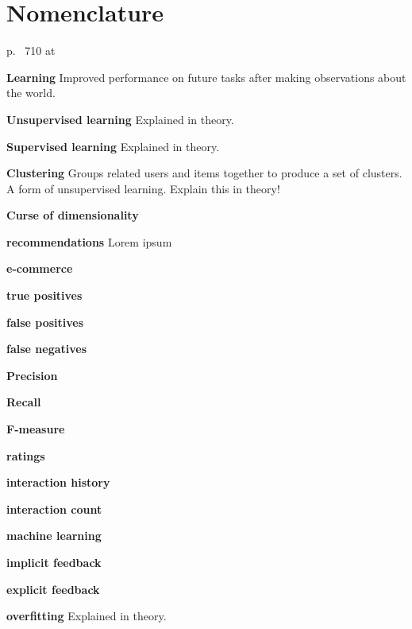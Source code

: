 \chapter{Nomenclature}\label{cha:def}

p. ~710 at \citep{norvigAI}

\textbf{Learning} Improved performance on future tasks after making observations about the world.

\textbf{Unsupervised learning} Explained in theory.

\textbf{Supervised learning} Explained in theory.

\textbf{Clustering} Groups related users and items together to produce a set of clusters. A form of unsupervised learning. 
Explain this in theory!

\textbf{Curse of dimensionality}

\vspace{2cm}


\textbf{recommendations} Lorem ipsum

\textbf{e-commerce}

\textbf{true positives}

\textbf{false positives}

\textbf{false negatives}

\textbf{Precision}

\textbf{Recall}

\textbf{F-measure}

\textbf{ratings}

\textbf{interaction history}

\textbf{interaction count}

\textbf{machine learning}

\textbf{implicit feedback}

\textbf{explicit feedback}

\textbf{overfitting} Explained in theory.

